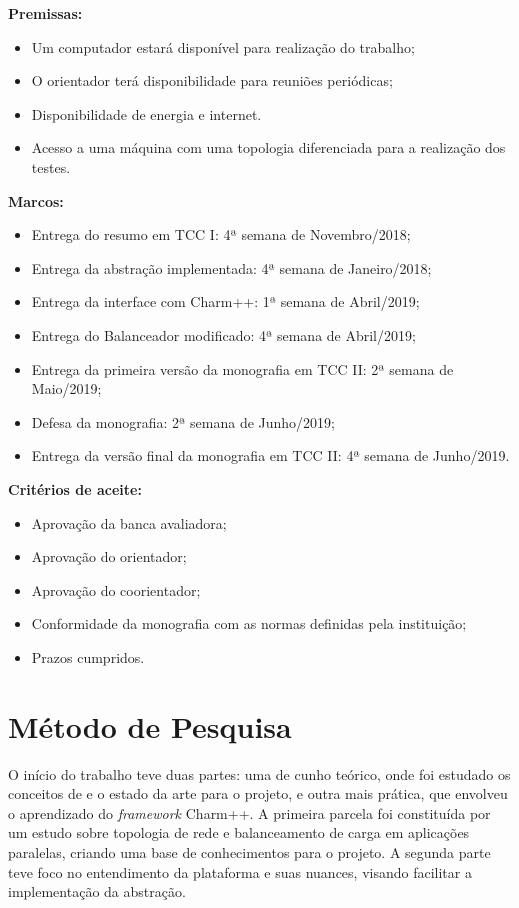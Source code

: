 \documentclass[
	12pt,				%
	openright,			%
	twoside,			%
	a4paper,			%
	english,			%
	brazil,				%
	]{abntex2}
\newcommand{\charm}{{{Charm++}}\xspace}
\begin{document}
\begin{flushleft}
\textbf{Premissas:}
\begin{itemize}
\item Um computador estará disponível para realização do trabalho; 
\item O orientador terá disponibilidade para reuniões periódicas;
\item Disponibilidade de energia e internet.
\item Acesso a uma máquina com uma topologia diferenciada para a realização dos testes.
\end{itemize}

\textbf{Marcos:}
\begin{itemize}
 
\item Entrega do resumo em TCC I: 4ª semana de Novembro/2018; 
\item Entrega da abstração implementada: 4ª semana de Janeiro/2018;
\item Entrega da interface com \charm: 1ª semana de Abril/2019;
\item Entrega do Balanceador modificado: 4ª semana de Abril/2019;
\item Entrega da primeira versão da monografia em TCC II: 2ª semana de Maio/2019; 
\item Defesa da monografia: 2ª semana de Junho/2019;
\item Entrega da versão final da monografia em TCC II: 4ª semana de Junho/2019.
\end{itemize}

\textbf{Critérios de aceite:}
\begin{itemize}
\item Aprovação da banca avaliadora;
\item Aprovação do orientador;
\item Aprovação do coorientador;
\item Conformidade da monografia com as normas definidas pela instituição;
\item Prazos cumpridos.
\end{itemize}
\end{flushleft}

\section{Método de Pesquisa}
\label{sec:metodologia}

 
O início do trabalho teve duas partes: uma de cunho teórico, onde foi estudado os conceitos de e o estado da arte para o projeto, e outra mais prática, que envolveu o aprendizado do \textit{framework} \charm. A primeira parcela foi constituída por um estudo sobre topologia de rede e balanceamento de carga em aplicações paralelas, criando uma base de conhecimentos para o projeto. A segunda parte teve foco no entendimento da plataforma e suas nuances, visando facilitar a implementação da abstração.
\end{document}
